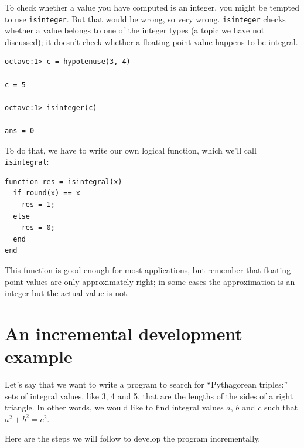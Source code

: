 \documentclass{book}
\begin{document}
To check whether a value you have computed is an integer, you might
be tempted to use {\tt isinteger}. But that would be wrong, so very
wrong. {\tt isinteger} checks whether a value belongs to one of
the integer types (a topic we have not discussed); it doesn't check
whether a floating-point value happens to be integral.

\begin{verbatim}
octave:1> c = hypotenuse(3, 4)

c = 5

octave:1> isinteger(c)

ans = 0
\end{verbatim}

To do that, we have to write our own logical function, which
we'll call {\tt isintegral}:

\begin{verbatim}
function res = isintegral(x)
  if round(x) == x
    res = 1;
  else
    res = 0;
  end
end
\end{verbatim}

This function is good enough for most applications, but remember
that floating-point values are only approximately right; in some
cases the approximation is an integer but the actual
value is not.


\section{An incremental development example}
\label{increxample}

Let's say that we want to write a program to search for ``Pythagorean
triples:'' sets of integral values, like 3, 4 and 5,
that are the lengths of the sides of a right triangle. In other
words, we would like to find integral values $a$, $b$ and $c$ such
that $a^2 + b^2 = c^2$.

Here are the steps we will follow to develop the program incrementally.
\end{document}
